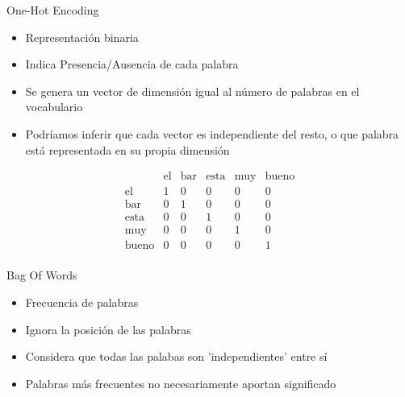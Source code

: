 \documentclass{beamer}
\begin{document}
\begin{frame}{One-Hot Encoding}
	\begin{itemize}
		\item Representación binaria
		\item Indica Presencia/Ausencia de cada palabra	
		\item Se genera un vector de dimensión igual al número de palabras en el vocabulario
		\item Podríamos inferir que cada vector es independiente del resto, o que palabra está representada en su propia dimensión
	\end{itemize}
\[
\begin{array}{c|ccccc}
      & \text{el} & \text{bar} & \text{esta} & \text{muy} & \text{bueno} \\
\hline
\text{el}    & 1 & 0 & 0 & 0 & 0 \\
\text{bar}   & 0 & 1 & 0 & 0 & 0 \\
\text{esta}  & 0 & 0 & 1 & 0 & 0 \\
\text{muy}   & 0 & 0 & 0 & 1 & 0 \\
\text{bueno} & 0 & 0 & 0 & 0 & 1 \\
\end{array}
\]
	
\end{frame}

\begin{frame}{Bag Of Words}
	\begin{itemize}
		\item Frecuencia de palabras 
		\item Ignora la posición de las palabras
		\item Considera que todas las palabas son 'independientes' entre sí
		\item Palabras más frecuentes no necesariamente aportan significado 
	\end{itemize}
	\vspace{2em}

\end{frame}
\end{document}
